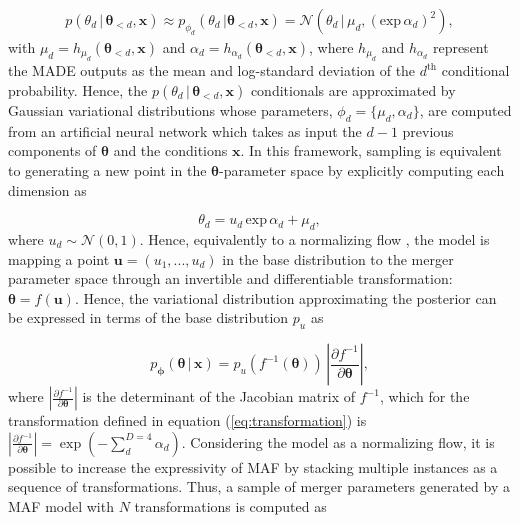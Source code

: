 \begin{align}
    p(\theta_{d} \, | \, \bm{\theta}_{<d}, \bm{x} ) \approx p_{\phi_d}(\theta_d\, | \bm{\theta}_{<d},\bm{x})=  \mathcal{N} \left( \theta_{d} \, | \, \mu_{d}, (\text{exp} \, \alpha_{d})^2 \right),
\end{align}
with $\mu_{d}= h_{\mu_{d}} (\bm{\theta}_{<d},\bm{x})$ and $\alpha_{d} = h_{\alpha_{d}} (\bm{\theta}_{<d}, \bm{x})$, where $h_{\mu_{d}}$ and $h_{\alpha_{d}}$ represent the MADE outputs as the mean and log-standard deviation of the $d^{\text{th}}$ conditional probability. Hence, the $p(\theta_{d} \, | \, \bm{\theta}_{<d}, \bm{x} )$ conditionals are approximated by Gaussian variational distributions whose parameters, $\phi_d=\{\mu_d, \alpha_d\}$, are computed from an artificial neural network which takes as input the $d-1$ previous components of $\bm{\theta}$ and the conditions $\bm{x}$. In this framework, sampling is equivalent to generating a new point in the $\bm{\theta}$-parameter space by explicitly computing each dimension as 

\begin{equation}
    \theta_{d} = u_d \, \text{exp} \, \alpha_{d} + \mu_{d},
\label{eq:transformation}
\end{equation}
where $u_{d} \sim \mathcal{N}(0,1)$. Hence, equivalently to a normalizing flow \citep{Papamakarios2021}, the model is mapping a point $\bm{u}=(u_1,...,u_d)$ in the base distribution to the merger parameter space through an invertible and differentiable transformation: $\bm{\theta} = f(\bm{u})$. Hence, the variational distribution approximating the posterior can be expressed in terms of the base distribution $p_{u}$ as 

\begin{equation}
    p_{\bm{\phi}}(\bm{\theta} \, | \, \bm{x} ) = p_{u}(f^{-1}(\bm{\theta})) \, \left | \frac{\partial f^{-1}}{\partial \bm{\theta} }\right |,
\label{eq:flow}
\end{equation}
where $\left | \frac{\partial f^{-1}}{\partial \bm{\theta} }\right |$ is the determinant of the Jacobian matrix of $f^{-1}$, which for the transformation defined in equation (\ref{eq:transformation}) is $\left | \frac{\partial f^{-1}}{\partial \bm{\theta} }\right | = \exp\left(-\sum_{d}^{D=4}\alpha_{d}\right)$.
Considering the model as a normalizing flow, it is possible to increase the expressivity of MAF by stacking multiple instances as a sequence of transformations. Thus, a sample of merger parameters generated by a MAF model with $N$ transformations is computed as


